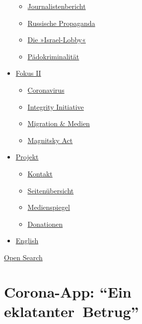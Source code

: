 \begin{itemize}
  \begin{itemize}
  \tightlist
  \item
    \href{https://swprs.org/bericht-eines-journalisten/}{Journalistenbericht}
  \item
    \href{https://swprs.org/russische-propaganda/}{Russische Propaganda}
  \item
    \href{https://swprs.org/die-israel-lobby-fakten-und-mythen/}{Die
    »Israel-Lobby«}
  \item
    \href{https://swprs.org/geopolitik-und-paedokriminalitaet/}{Pädokriminalität}
  \end{itemize}
\item
  \href{https://swprs.org/migration-und-medien/}{Fokus II}

  \begin{itemize}
  \tightlist
  \item
    \href{https://swprs.org/covid-19-hinweis-ii/}{Coronavirus}
  \item
    \href{https://swprs.org/die-integrity-initiative/}{Integrity
    Initiative}
  \item
    \href{https://swprs.org/migration-und-medien/}{Migration \& Medien}
  \item
    \href{https://swprs.org/der-fall-magnitsky/}{Magnitsky Act}
  \end{itemize}
\item
  \href{https://swprs.org/kontakt/}{Projekt}

  \begin{itemize}
  \tightlist
  \item
    \href{https://swprs.org/kontakt/}{Kontakt}
  \item
    \href{https://swprs.org/uebersicht/}{Seitenübersicht}
  \item
    \href{https://swprs.org/medienspiegel/}{Medienspiegel}
  \item
    \href{https://swprs.org/donationen/}{Donationen}
  \end{itemize}
\item
  \href{https://swprs.org/contact/}{English}
\end{itemize}

\protect\hyperlink{}{Open Search}

\hypertarget{corona-app-ein-eklatanter-betrug}{%
\section{Corona-App: ``Ein
eklatanter~Betrug''}\label{corona-app-ein-eklatanter-betrug}}

